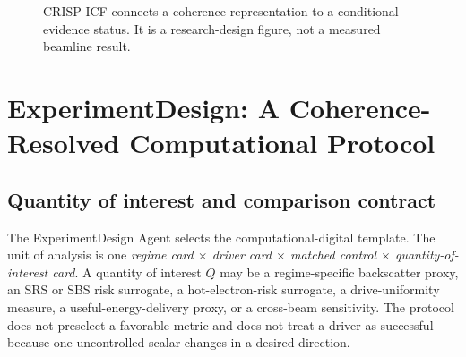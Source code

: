 \documentclass[conference]{../../../../Conference-LaTeX-template_10-17-19/IEEEtran}
\begin{document}
\begin{figure}[!t]
\centering
{}
\caption{CRISP-ICF connects a coherence representation to a conditional evidence status. It is a research-design figure, not a measured beamline result.}
\label{fig:crisp}
\end{figure}

\section{ExperimentDesign: A Coherence-Resolved Computational Protocol}
\subsection{Quantity of interest and comparison contract}
The ExperimentDesign Agent selects the computational-digital template. The unit of analysis is one \emph{regime card $\times$ driver card $\times$ matched control $\times$ quantity-of-interest card}. A quantity of interest $Q$ may be a regime-specific backscatter proxy, an SRS or SBS risk surrogate, a hot-electron-risk surrogate, a drive-uniformity measure, a useful-energy-delivery proxy, or a cross-beam sensitivity. The protocol does not preselect a favorable metric and does not treat a driver as successful because one uncontrolled scalar changes in a desired direction.
\end{document}
